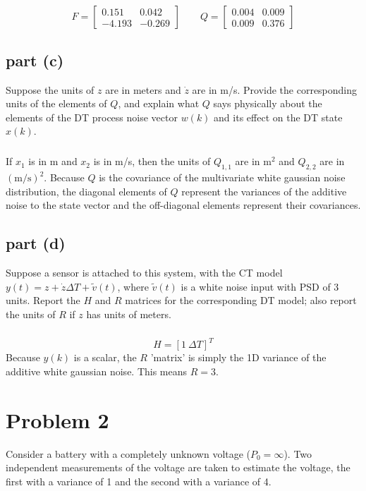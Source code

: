 \documentclass[11pt]{article}
\begin{document}
\subparagraph*{}
\begin{equation*}
	F=\begin{bmatrix} 0.151 & 0.042 \\ -4.193 & -0.269 \end{bmatrix} \qquad Q = \begin{bmatrix} 0.004 & 0.009 \\ 0.009 & 0.376 \end{bmatrix}
\end{equation*}

\subsection*{part (c)}
Suppose the units of $z$ are in meters and $\dot{z}$ are in m/s. Provide the corresponding units of the elements of $Q$, and explain what $Q$ says physically about the elements of the DT process noise vector $w(k)$ and its effect on the DT state $x(k)$.

\subparagraph*{}
If $x_1$ is in m and $x_2$ is in m/s, then the units of $Q_{1,1}$ are in $\text{m}^2$ and $Q_{2,2}$ are in $(\text{m/s})^2$. Because $Q$ is the covariance of the multivariate white gaussian noise distribution, the diagonal elements of $Q$ represent the variances of the additive noise to the state vector and the off-diagonal elements represent their covariances.

\subsection*{part (d)}
Suppose a sensor is attached to this system, with the CT model $y(t)=z+\dot{z}\Delta T+\tilde{v}(t)$, where $\tilde{v}(t)$ is a white noise input with PSD of 3 units. Report the $H$ and $R$ matrices for the corresponding DT model; also report the units of $R$ if $z$ has units of meters.

\subparagraph*{}
\begin{equation*}
	H=[1\ \Delta T]^T
\end{equation*}
Because $y(k)$ is a scalar, the $R$ 'matrix' is simply the 1D variance of the additive white gaussian noise. This means $R=3$.

\section*{Problem 2}
Consider a battery with a completely unknown voltage ($P_0=\infty$). Two independent measurements of the voltage are taken to estimate the voltage, the first with a variance of 1 and the second with a variance of 4.
\end{document}
